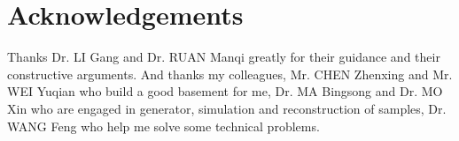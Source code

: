 \documentclass[11pt,a4paper]{cepcnote}
\newcommand{\BibTeX}{{\sc Bib\TeX}}
\begin{document}
%

\section{Acknowledgements}

Thanks Dr. LI Gang and Dr. RUAN Manqi greatly for their guidance and their constructive arguments.
And thanks my colleagues, Mr. CHEN Zhenxing and Mr. WEI Yuqian who build a good basement for me, 
Dr. MA Bingsong and Dr. MO Xin who are engaged in generator, simulation and reconstruction of samples, 
Dr. WANG Feng who help me solve some technical problems.

%
%
%
%
%
%





\end{document}
